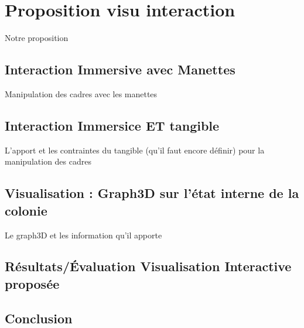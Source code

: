 \chapter{Proposition visu interaction}
	Notre proposition
	\section{Interaction Immersive avec Manettes}
		Manipulation des cadres avec les manettes
	\section{Interaction Immersice ET tangible}
		L'apport et les contraintes du tangible (qu'il faut encore définir) pour la manipulation des cadres
	\section{Visualisation : Graph3D sur l'état interne de la colonie}
		Le graph3D et les information qu'il apporte
	\section{Résultats/Évaluation Visualisation Interactive proposée}
	
			
	\section*{Conclusion}
	